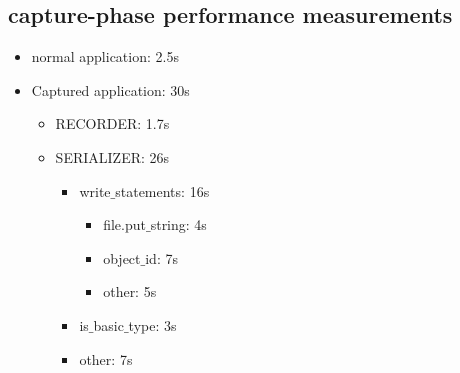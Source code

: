 \documentclass[a4paper,10pt]{article}
\begin{document}
\subsection{capture-phase performance measurements}
\begin{itemize}
	\item normal application: 2.5s
	\item Captured application: 30s
	\begin{itemize}
		\item RECORDER: 1.7s\\
		\item SERIALIZER: 26s
		\begin{itemize}
			\item write$\_$statements: 16s
			\begin{itemize}
				\item file.put$\_$string: 4s
				\item object$\_$id: 7s
				\item other: 5s
			\end{itemize}
			\item is$\_$basic$\_$type: 3s
			\item other: 7s
		\end{itemize}
	\end{itemize}
\end{itemize}

 

\end{document}

